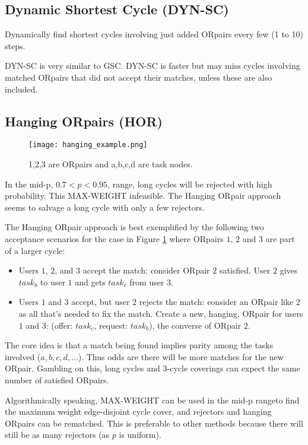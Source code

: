 \documentclass[main.tex]{subfiles}
\begin{document}
\subsection{Dynamic Shortest Cycle (DYN-SC)}
Dynamically find shortest cycles involving just added ORpairs every few (1 to 10) steps.

DYN-SC is very similar to GSC. DYN-SC is faster but may miss cycles involving matched ORpairs that did not accept their matches, unless these are also included.

\subsection{Hanging ORpairs (HOR)}
\begin{figure}
  \texttt{[image: hanging\_example.png]}
  \caption{1,2,3 are ORpairs and a,b,c,d are task nodes.}
  \label{hanging_example}
\end{figure}

In the mid-p, $0.7 < p < 0.95$, range, long cycles will be rejected with high probability. This MAX-WEIGHT infeasible. The Hanging ORpair approach seems to salvage a long cycle with only a few rejectors.

The Hanging ORpair approach is best exemplified by the following two acceptance scenarios for the case in Figure \ref{hanging_example} where ORpairs $1$, $2$ and $3$ are part of a larger cycle:
\begin{itemize}
  \item Users $1$, $2$, and $3$ accept the match: consider ORpair $2$ satisfied. User $2$ gives $task_b$ to user $1$ and gets $task_c$ from user $3$.
  \item Users $1$ and $3$ accept, but user $2$ rejects the match: consider an ORpair like $2$ as all that's needed to fix the match. Create a new, hanging, ORpair for users $1$ and $3$: (offer: $task_c$, request: $task_b$), the converse of ORpair $2$.
\end{itemize}

The core idea is that a match being found implies parity among the tasks involved ($a, b, c, d, \dots$). Thus odds are there will be more matches for the new ORpair. Gambling on this, long cycles and 3-cycle coverings can expect the same number of satisfied ORpairs.

Algorithmically speaking, MAX-WEIGHT can be used in the mid-p rangeto find the maximum weight edge-disjoint cycle cover, and rejectors and hanging ORpairs can be rematched. This is preferable to other methods because there will still be as many rejectors (as $p$ is uniform).
\end{document}
